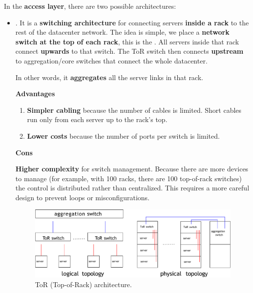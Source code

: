 \noindent
In the \textbf{access layer}, there are two possible architectures:
\begin{itemize}
    \item {}. It is a \textbf{switching architecture} for connecting servers \textbf{inside a rack} to the rest of the datacenter network. The idea is simple, we place a \textbf{network switch at the top of each rack}, this is the . All servers inside that rack connect \textbf{upwards} to that switch. The ToR switch then connects \textbf{upstream} to aggregation/core switches that connect the whole datacenter.
    
    In other words, it \textbf{aggregates} all the server links in that rack.\label{ToR (Top-of-Rack) architecture}
    
    \begin{flushleft}
        \textcolor{Green3}{ \textbf{Advantages}}
    \end{flushleft}
    \begin{enumerate}
        \item \textbf{Simpler cabling} because the number of cables is limited. Short cables run only from each server up to the rack's top.
        \item \textbf{Lower costs} because the number of ports per switch is limited.
    \end{enumerate}

    \begin{flushleft}
        \textcolor{Red2}{ \textbf{Cons}}
    \end{flushleft}
    \textbf{Higher complexity} for switch management. Because there are more devices to manage (for example, with 100 racks, there are 100 top-of-rack switches) the control is distributed rather than centralized. This requires a more careful design to prevent loops or misconfigurations.

    \begin{figure}[!htp]
        \centering
        \includegraphics[width=\textwidth]{img/networking-2.pdf}
        \caption{ToR (Top-of-Rack) architecture.}
    \end{figure}


\end{itemize}
